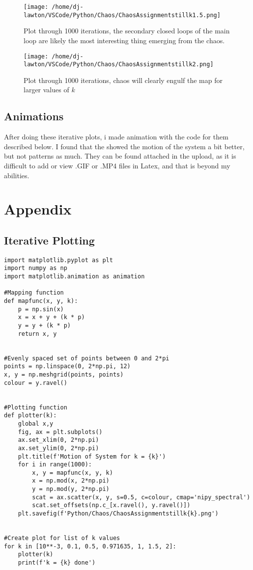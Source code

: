 \documentclass{article}
\begin{document}
\begin{figure}[H]
\begin{center}
\texttt{[image: /home/dj-lawton/VSCode/Python/Chaos/ChaosAssignmentstillk1.5.png]}
\caption{\label{fig: k=1.5}Plot through 1000 iterations, the secondary closed loops of the main loop are likely the most interesting thing emerging from the chaos.}
\end{center}
\end{figure}

\begin{figure}[H]
\begin{center}
\texttt{[image: /home/dj-lawton/VSCode/Python/Chaos/ChaosAssignmentstillk2.png]}
\caption{\label{fig: k=2}Plot through 1000 iterations, chaos will clearly engulf the map for larger values of $k$}
\end{center}
\end{figure}
\subsection{Animations}
After doing these iterative plots, i made animation with the code for them described below. I found that the showed the motion of the system a bit better, but not patterns as much. They can be found attached in the upload, as it is difficult to add or view .GIF or .MP4 files in Latex, and that is beyond my abilities.
\section{Appendix}
\subsection{Iterative Plotting}
\begin{lstlisting}
import matplotlib.pyplot as plt
import numpy as np
import matplotlib.animation as animation

#Mapping function
def mapfunc(x, y, k):
    p = np.sin(x)
    x = x + y + (k * p)
    y = y + (k * p)
    return x, y


#Evenly spaced set of points between 0 and 2*pi
points = np.linspace(0, 2*np.pi, 12)
x, y = np.meshgrid(points, points)
colour = y.ravel()


#Plotting function
def plotter(k):
    global x,y
    fig, ax = plt.subplots()
    ax.set_xlim(0, 2*np.pi)
    ax.set_ylim(0, 2*np.pi)
    plt.title(f'Motion of System for k = {k}')
    for i in range(1000):
        x, y = mapfunc(x, y, k)
        x = np.mod(x, 2*np.pi)
        y = np.mod(y, 2*np.pi)
        scat = ax.scatter(x, y, s=0.5, c=colour, cmap='nipy_spectral')
        scat.set_offsets(np.c_[x.ravel(), y.ravel()])
    plt.savefig(f'Python/Chaos/ChaosAssignmentstillk{k}.png')


#Create plot for list of k values
for k in [10**-3, 0.1, 0.5, 0.971635, 1, 1.5, 2]:
    plotter(k)
    print(f'k = {k} done')
\end{lstlisting}
\end{document}
